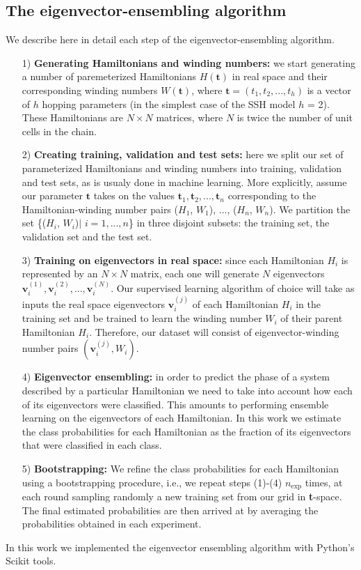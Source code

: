 \documentclass[fleqn,10pt]{wlscirep}
\begin{document}
\subsection*{The eigenvector-ensembling algorithm}

We describe here in detail each step of the eigenvector-ensembling algorithm.
\vspace{.3cm}
\begin{enumerate}[topsep=0pt, partopsep=0pt]
\item[1)] \textbf{Generating Hamiltonians and winding numbers:} we start generating a number of paremeterized Hamiltonians $H(\mathbf{t})$ in real space and their corresponding winding numbers $W(\mathbf{t})$, where $\mathbf{t} = (t_1, t_2,...,t_h)$ is a vector of $h$ hopping parameters (in the simplest case of the SSH model $h$ = 2). These Hamiltonians are $N\times N$ matrices, where $N$ is twice the number of unit cells in the chain.
\item[2)] \textbf{Creating training, validation and test sets:} here we split our set of parameterized Hamiltonians and winding numbers into training, validation and test sets, as is usualy done in machine learning. More explicitly, assume our parameter $\mathbf{t}$ takes on the values $\mathbf{t}_1, \mathbf{t}_2, ..., \mathbf{t}_n$ corresponding to the Hamiltonian-winding number pairs ($H_1$, $W_1$), ..., ($H_n$, $W_n$). We partition the set \{($H_i$, $W_i$)$\mid$ $i=1,...,n$\} in three disjoint subsets: the training set, the validation set and the test set.
\item[3)] \textbf{Training on eigenvectors in real space:} since each Hamiltonian $H_i$ is represented by an $N\times N$ matrix, each one will generate $N$ eigenvectors $\mathbf{v}_i^{(1)}, \mathbf{v}_i^{(2)},...,\mathbf{v}_i^{(N)}$. Our supervised learning algorithm of choice will take as inputs the real space eigenvectors $\mathbf{v}^{(j)}_i$ of each Hamiltonian $H_i$ in the training set and be trained to learn the winding number $W_i$ of their parent Hamiltonian $H_i$. Therefore, our dataset will consist of eigenvector-winding number pairs $(\mathbf{v}_i^{(j)}, W_i)$.
\item[4)]\textbf{Eigenvector ensembling:} in order to predict the phase of a system described by a particular Hamiltonian we need to take into account how each of its eigenvectors were classified. This amounts to performing ensemble learning on the eigenvectors of each Hamiltonian. In this work we estimate the class probabilities for each Hamiltonian as the fraction of its eigenvectors that were classified in each class.
\item[5)] \textbf{Bootstrapping:} We refine the class probabilities for each Hamiltonian using a bootstrapping procedure, i.e., we repeat steps (1)-(4) $n_\text{exp}$ times, at each round sampling randomly a new training set from our grid in \textbf{t}-space. The final estimated probabilities are then arrived at by averaging the probabilities obtained in each experiment.
\end{enumerate}
\vspace{.3cm}
In this work we implemented the eigenvector ensembling algorithm with Python's Scikit tools.
\end{document}
